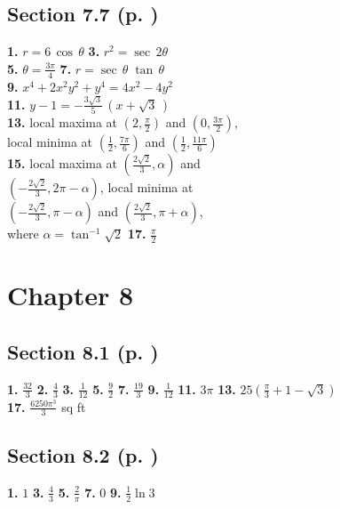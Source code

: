 \begin{multicols*}{2}
\subsection*{Section 7.7 (p. \pageref{sec7dot7})}
\textbf{1.} $r = 6\,\cos\,\theta$ \quad
\textbf{3.} $r^2 = \sec\,2\theta$\\
\textbf{5.} $\theta = \frac{3\pi}{4}$ \quad
\textbf{7.} $r = \sec\,\theta\;\tan\,\theta$\\
\textbf{9.} $x^4 + 2x^2y^2 + y^4 = 4x^2 - 4y^2$\\
\textbf{11.} $y - 1 = -\frac{3\sqrt{3}}{5}\,(x + \sqrt{3}\,)$\\
\textbf{13.} local maxima at $\left(2,\frac{\pi}{2}\right)$ and
$\left(0,\frac{3\pi}{2}\right)$,\\local minima at $\left(\frac{1}{2},\frac{7\pi}{6}\right)$
and $\left(\frac{1}{2},\frac{11\pi}{6}\right)$\\
\textbf{15.} local maxima at $\left(\frac{2\sqrt{2}}{3},\alpha\right)$ and\\
$\left(-\frac{2\sqrt{2}}{3},2\pi - \alpha\right)$, local minima at\\
$\left(-\frac{2\sqrt{2}}{3},\pi - \alpha\right)$ and
$\left(\frac{2\sqrt{2}}{3},\pi + \alpha\right)$,\\where $\alpha = \tan^{-1}\sqrt{2}$ \quad
\textbf{17.} $\frac{\pi}{2}$
\section*{Chapter 8}
\subsection*{Section 8.1 (p. \pageref{sec8dot1})}
\textbf{1.} $\frac{32}{3}$ \quad
\textbf{2.} $\frac{4}{3}$ \quad
\textbf{3.} $\frac{1}{12}$ \quad
\textbf{5.} $\frac{9}{2}$ \quad
\textbf{7.} $\frac{19}{3}$ \quad
\textbf{9.} $\frac{1}{12}$ \quad
\textbf{11.} $3\pi$ \quad
\textbf{13.} $25\left(\frac{\pi}{3}+1-\sqrt{3}\right)$\\
\textbf{17.} $\frac{6250\pi^3}{3}$ sq ft
\subsection*{Section 8.2 (p. \pageref{sec8dot2})}
\textbf{1.} $1$ \quad
\textbf{3.} $\frac{4}{3}$ \quad
\textbf{5.} $\frac{2}{\pi}$ \quad
\textbf{7.} $0$ \quad
\textbf{9.} $\frac{1}{2} \ln 3$

\end{multicols*}
